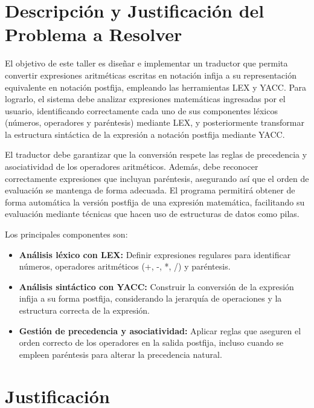 \documentclass{article}
\begin{document}

\section{Descripción y Justificación del Problema a Resolver}\label{sec:descr}

El objetivo de este taller es diseñar e implementar un traductor que permita convertir expresiones aritméticas escritas en notación infija a su representación equivalente en notación postfija, empleando las herramientas LEX y YACC. Para lograrlo, el sistema debe analizar expresiones matemáticas ingresadas por el usuario, identificando correctamente cada uno de sus componentes léxicos (números, operadores y paréntesis) mediante LEX, y posteriormente transformar la estructura sintáctica de la expresión a notación postfija mediante YACC.  

El traductor debe garantizar que la conversión respete las reglas de precedencia y asociatividad de los operadores aritméticos. Además, debe reconocer correctamente expresiones que incluyan paréntesis, asegurando así que el orden de evaluación se mantenga de forma adecuada. El programa permitirá obtener de forma automática la versión postfija de una expresión matemática, facilitando su evaluación mediante técnicas que hacen uso de estructuras de datos como pilas.  

Los principales componentes son:  
\begin{itemize}
    \item \textbf{Análisis léxico con LEX:} Definir expresiones regulares para identificar números, operadores aritméticos (+, -, *, /) y paréntesis.
    \item \textbf{Análisis sintáctico con YACC:} Construir la conversión de la expresión infija a su forma postfija, considerando la jerarquía de operaciones y la estructura correcta de la expresión.
    \item \textbf{Gestión de precedencia y asociatividad:} Aplicar reglas que aseguren el orden correcto de los operadores en la salida postfija, incluso cuando se empleen paréntesis para alterar la precedencia natural.
\end{itemize}

\section*{Justificación}
\end{document}
